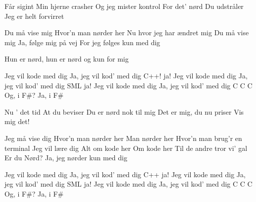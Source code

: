 \documentclass[a4paper,11pt]{article}
\begin{document}
\begin{song}
  Får sigint
  Min hjerne crasher
  Og jeg mister kontrol
  For det' nørd
  Du udstråler
  Jeg er helt forvirret

  Du må vise mig
  Hvor'n man nørder her
  Nu hvor jeg har ændret mig
  Du må vise mig
  Ja, følge mig på vej
  For jeg følges kun med dig

   Hun er nørd, hun er nørd og kun for mig

   Jeg vil kode med dig
   Ja, jeg vil kod' med dig
   C++! ja!
   Jeg vil kode med dig
   Ja, jeg vil kod' med dig
   SML ja!
   Jeg vil kode med dig
   Ja, jeg vil kod' med dig
   C C C
   Og, i F\#?
   Ja, i F\#

  Nu ' det tid
  At du beviser
  Du er nørd nok til mig
  Det er mig, du nu priser
  Vis mig det!

   Jeg må vise dig
   Hvor'n man nørder her
   Man nørder her
   Hvor'n man brug'r en terminal
   Jeg vil lære dig
   Alt om kode her
   Om kode her
   Til de andre tror vi' gal
   Er du Nørd?
   Ja, jeg nørder kun med dig

   Jeg vil kode med dig
   Ja, jeg vil kod' med dig
   C++ ja!
   Jeg vil kode med dig
   Ja, jeg vil kod' med dig
   SML ja!
   Jeg vil kode med dig
   Ja, jeg vil kod' med dig
   C C C
   Og, i F\#?
   Ja, i F\#
  \end{song}
\end{document}
